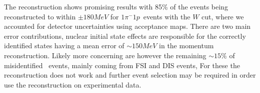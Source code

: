 \documentclass[a4paper,12pt]{article}
\newcommand{\md}{$1\pi^-1p$}
\begin{document}
The reconstruction shows promising results with 85\% of the events being reconstructed to within $\pm 180\si{MeV}$ for \md\ events with the $W$ cut, where we accounted for detector uncertainties using acceptance maps.
There are two main error contributions, nuclear initial state effects are responsible for the correctly identified states having a mean error of $\sim 150 \si{MeV}$ in the momentum reconstruction.
Likely more concerning are however the remaining $\sim 15\%$ of misidentified \dm\ events, mainly coming from FSI and DIS events,
For these the reconstruction does not work and further event selection may be required in order use the reconstruction on experimental data.

\newpage

\printbibliography

\newpage
\end{document}
